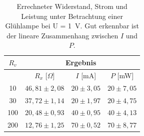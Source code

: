 \documentclass[a4paper,usenatbib]{aspdoc}
\begin{document}
            \begin{table}
                \centering
                \begin{tabular}{c|ccc}
                    \multicolumn{1}{c}{$R_v$} & \multicolumn{3}{c}{Ergebnis} \\
                    \cmidrule(l){0-0}\cmidrule(lr){2-4}
                    \toprule
                     & $R_x$ [$\Omega$]    & $I$ [mA]   & $P$ [mW] \\ 
                        10  & $46,81 \pm 2,08$      & $20 \pm 3,05$        & $20 \pm 7,05$    \\ 
                        30   & $37,72 \pm 1,14$     & $20 \pm 1,97$        & $20 \pm 4,75$    \\ 
                        100   & $20,48 \pm 0,93$    & $40 \pm 0,95$        & $40 \pm 4,13$    \\ 
                        200   & $12,76 \pm 1,25$    & $70 \pm 0,52$   & $70 \pm 8,77 $   \\
                    \bottomrule
                \end{tabular}
                \caption{Errechneter Widerstand, Strom und Leistung unter Betrachtung einer Glühlampe bei U = \SI{1}{V}. Gut erkennbar ist der lineare Zusammenhang zwischen $I$ und $P$.}
                \label{tab:gluh}
            \end{table}
\end{document}
